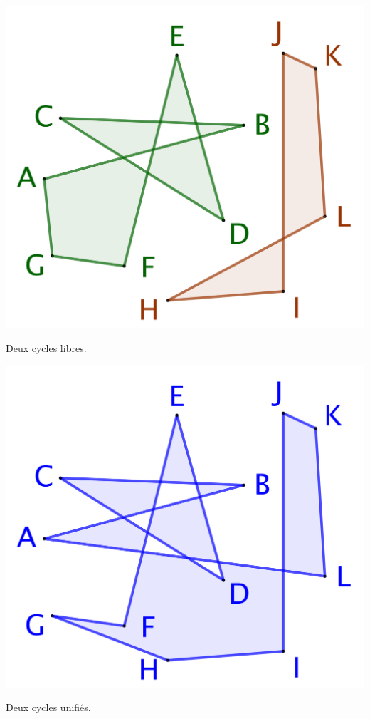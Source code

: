 \begin{multicols}{2}
    \small\itshape
    \begin{center}
        \includegraphics[scale=.4]{content/polygon/at-least-one/unification-1.png}

        \smallskip
        Deux cycles libres.
    \end{center}


    \begin{center}
        \includegraphics[scale=.4]{content/polygon/at-least-one/unification-2.png}

        \smallskip
        Deux cycles unifiés.
    \end{center}
\end{multicols}


